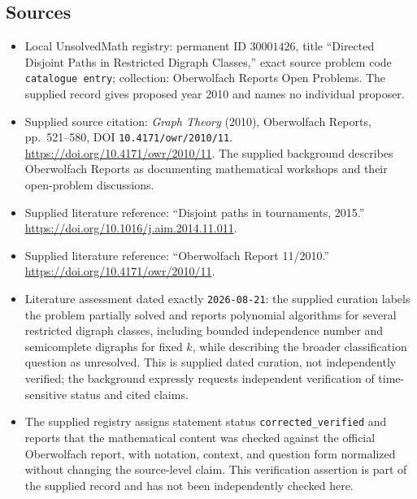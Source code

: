 \documentclass[11pt]{article}
\begin{document}
\subsection{Sources}
\begin{itemize}
\item Local UnsolvedMath registry: permanent ID \(30001426\), title ``Directed Disjoint Paths in Restricted Digraph Classes,'' exact source problem code \texttt{catalogue entry}; collection: Oberwolfach Reports Open Problems. The supplied record gives proposed year 2010 and names no individual proposer.
\item Supplied source citation: \emph{Graph Theory} (2010), Oberwolfach Reports, pp.\ 521--580, DOI \texttt{10.4171/owr/2010/11}. \url{https://doi.org/10.4171/owr/2010/11}. The supplied background describes Oberwolfach Reports as documenting mathematical workshops and their open-problem discussions.
\item Supplied literature reference: ``Disjoint paths in tournaments, 2015.'' \url{https://doi.org/10.1016/j.aim.2014.11.011}.
\item Supplied literature reference: ``Oberwolfach Report 11/2010.'' \url{https://doi.org/10.4171/owr/2010/11}.
\item Literature assessment dated exactly \texttt{2026-08-21}: the supplied curation labels the problem partially solved and reports polynomial algorithms for several restricted digraph classes, including bounded independence number and semicomplete digraphs for fixed \(k\), while describing the broader classification question as unresolved. This is supplied dated curation, not independently verified; the background expressly requests independent verification of time-sensitive status and cited claims.
\item The supplied registry assigns statement status \texttt{corrected\_verified} and reports that the mathematical content was checked against the official Oberwolfach report, with notation, context, and question form normalized without changing the source-level claim. This verification assertion is part of the supplied record and has not been independently checked here.
\end{itemize}
\end{document}
